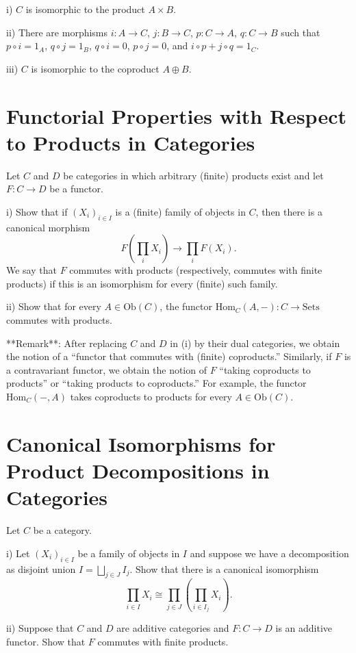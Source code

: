 \documentclass[lang=cn,11pt]{template}
\begin{document}
i) \( C \) is isomorphic to the product \( A \times B \).

ii) There are morphisms \( i : A \rightarrow C \), \( j : B \rightarrow C \), \( p : C \rightarrow A \), \( q : C \rightarrow B \) such that \( p \circ i = 1_A \), \( q \circ j = 1_B \), \( q \circ i = 0 \), \( p \circ j = 0 \), and \( i \circ p + j \circ q = 1_C \).

iii) \( C \) is isomorphic to the coproduct \( A \oplus B \).

\section{Functorial Properties with Respect to Products in Categories}
Let \( C \) and \( D \) be categories in which arbitrary (finite) products exist and let \( F : C \rightarrow D \) be a functor.

i) Show that if \( (X_i)_{i \in I} \) is a (finite) family of objects in \( C \), then there is a canonical morphism
\[
F\left(\prod_{i} X_i\right) \rightarrow \prod_{i} F(X_i).
\]
We say that \( F \) commutes with products (respectively, commutes with finite products) if this is an isomorphism for every (finite) such family.

ii) Show that for every \( A \in \text{Ob}(C) \), the functor \( \text{Hom}_C(A, -) : C \rightarrow \text{Sets} \) commutes with products.

**Remark**: After replacing \( C \) and \( D \) in (i) by their dual categories, we obtain the notion of a “functor that commutes with (finite) coproducts.” Similarly, if \( F \) is a contravariant functor, we obtain the notion of \( F \) “taking coproducts to products” or “taking products to coproducts.” For example, the functor \( \text{Hom}_C(-, A) \) takes coproducts to products for every \( A \in \text{Ob}(C) \).

\section{Canonical Isomorphisms for Product Decompositions in Categories}
Let \( C \) be a category.

i) Let \( (X_i)_{i \in I} \) be a family of objects in \( I \) and suppose we have a decomposition as disjoint union \( I = \bigsqcup_{j \in J} I_j \). Show that there is a canonical isomorphism
\[
\prod_{i \in I} X_i \cong \prod_{j \in J} \left( \prod_{i \in I_j} X_i \right).
\]

ii) Suppose that \( C \) and \( D \) are additive categories and \( F : C \rightarrow D \) is an additive functor. Show that \( F \) commutes with finite products.
\end{document}

